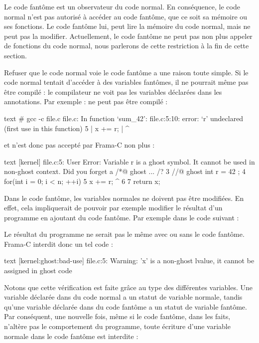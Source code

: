 Le code fantôme est un observateur du code normal. En conséquence, le code normal
n'est pas autorisé à accéder au code fantôme, que ce soit sa mémoire ou ses
fonctions. Le code fantôme lui, peut lire la mémoire du code normal, mais ne peut
pas la modifier. Actuellement, le code fantôme ne peut pas non plus appeler de
fonctions du code normal, nous parlerons de cette restriction à la fin de cette
section.


Refuser que le code normal voie le code fantôme a une raison toute simple. Si le
code normal tentait d'accéder à des variables fantômes, il ne pourrait même pas
être compilé : le compilateur ne voit pas les variables déclarées dans les
annotations. Par exemple :
ne peut pas être compilé :
\begin{CodeBlock}{text}
# gcc -c file.c
file.c: In function ‘sum_42’:
file.c:5:10: error: ‘r’ undeclared (first use in this function)
    5 |     x += r;
      |          ^
\end{CodeBlock}
et n'est donc pas accepté par Frama-C non plus :
\begin{CodeBlock}{text}
[kernel] file.c:5: User Error:
Variable r is a ghost symbol. It cannot be used in non-ghost context. Did you forget a /*@ ghost ... /?
  3       //@ ghost int r = 42 ;
  4       for(int i = 0; i < n; ++i){
  5         x += r;
                 ^
  6       }
  7       return x;
\end{CodeBlock}


Dans le code fantôme, les variables normales ne doivent pas être modifiées. En effet,
cela impliquerait de pouvoir par exemple modifier le résultat d'un programme en
ajoutant du code fantôme. Par exemple dans le code suivant :




Le résultat du programme ne serait pas le même avec ou sans le code fantôme.
Frama-C interdit donc un tel code :


\begin{CodeBlock}{text}
[kernel:ghost:bad-use] file.c:5: Warning:
  'x' is a non-ghost lvalue, it cannot be assigned in ghost code
\end{CodeBlock}


Notons que cette vérification est faite grâce au type des différentes variables.
Une variable déclarée dans du code normal a un statut de variable normale, tandis
qu'une variable déclarée dans du code fantôme a un statut de variable fantôme.
Par conséquent, une nouvelle fois, même si le code fantôme, dans les faits,
n'altère pas le comportement du programme, toute écriture d'une variable normale
dans le code fantôme est interdite :


